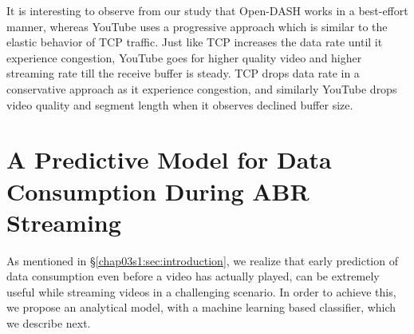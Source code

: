 It is interesting to observe from our study that Open-DASH works in a best-effort manner, whereas YouTube uses a progressive approach which is similar to the elastic behavior of TCP traffic. Just like TCP increases the data rate until it experience congestion, YouTube goes for higher quality video and higher streaming rate till the receive buffer is steady. TCP drops data rate in a conservative approach as it experience congestion, and similarly YouTube drops video quality and segment length when it observes declined buffer size.   


\section{A Predictive Model for Data Consumption During ABR Streaming}
\label{chap03s1:sec:model}

As mentioned in \S\ref{chap03s1:sec:introduction}, we realize that early prediction of data consumption even before a video has actually played, can be extremely useful while streaming videos in a challenging scenario.
In order to achieve this, we propose an analytical model, with a machine learning based classifier, which we describe next.

